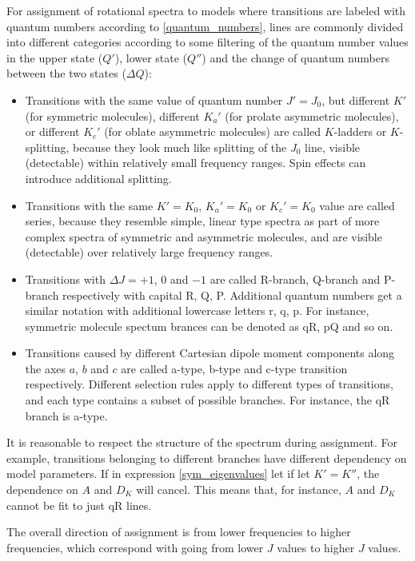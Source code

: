 \documentclass[11pt]{article}
\begin{document}
For assignment of rotational spectra to models where transitions are labeled with quantum numbers according to \ref{quantum_numbers}, lines are commonly divided into  different categories according to some filtering of the quantum number values in the upper state ($Q'$), lower state ($Q''$) and the change of quantum numbers between the two states ($\Delta Q$):
\begin{itemize}
	\item Transitions with the same value of quantum number $J' = J_0$, but different $K'$ (for symmetric molecules), different $K_a'$ (for prolate asymmetric molecules), or different $K_c'$ (for oblate asymmetric molecules) are called $K$-ladders or $K$-splitting, because they look much like splitting of the $J_0$ line, visible (detectable) within relatively small frequency ranges. Spin effects can introduce additional splitting.  
	\item Transitions with the same $K' = K_0$, $K_a' = K_0$ or $K_c' = K_0$ value are called series, because they resemble simple, linear type spectra as part of more complex spectra of symmetric and asymmetric molecules, and are visible (detectable) over relatively large frequency ranges.
	\item Transitions with $\Delta J = +1$, $0$ and $-1$ are called R-branch, Q-branch and P-branch respectively with capital R, Q, P. Additional quantum numbers get a similar notation with additional lowercase letters r, q, p. For instance, symmetric molecule spectum brances can be denoted as qR, pQ and so on. 
	\item Transitions caused by different Cartesian dipole moment components along the axes $a$, $b$ and $c$ are called a-type, b-type and c-type transition respectively. Different selection rules apply to different types of transitions, and each type contains a subset of possible branches. For instance, the qR branch is a-type.
	
\end{itemize}

It is reasonable to respect the structure of the spectrum during assignment. For example, transitions belonging to different branches have different dependency on model parameters. If in expression \ref{sym_eigenvalues} let if let $K' = K''$, the dependence on $A$ and $D_K$ will cancel. This means that, for instance, $A$ and $D_K$ cannot be fit to just qR lines. 

The overall direction of assignment is from lower frequencies to higher frequencies, which correspond with going from lower $J$ values to higher $J$ values. 
\end{document}
